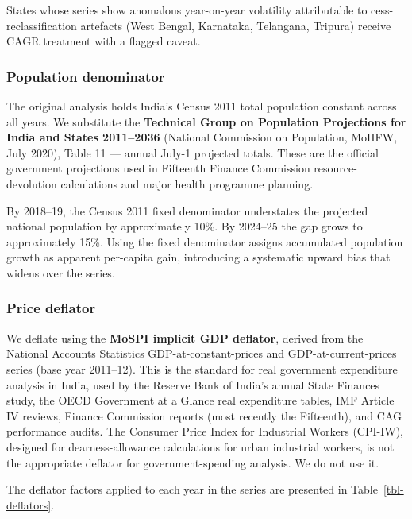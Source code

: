 \documentclass[
  11pt,
  oneside,
  10pt,
  a4paper,
  twocolumn]{article}
\begin{document}
States whose series show anomalous year-on-year volatility attributable
to cess-reclassification artefacts (West Bengal, Karnataka, Telangana,
Tripura) receive CAGR treatment with a flagged caveat.

\subsubsection{Population denominator}\label{population-denominator}

The original analysis holds India's Census 2011 total population
constant across all years. We substitute the \textbf{Technical Group on
Population Projections for India and States 2011--2036} (National
Commission on Population, MoHFW, July 2020), Table 11 --- annual July-1
projected totals. These are the official government projections used in
Fifteenth Finance Commission resource-devolution calculations and major
health programme planning.

By 2018--19, the Census 2011 fixed denominator understates the projected
national population by approximately 10\%. By 2024--25 the gap grows to
approximately 15\%. Using the fixed denominator assigns accumulated
population growth as apparent per-capita gain, introducing a systematic
upward bias that widens over the series.

\subsubsection{Price deflator}\label{price-deflator}

We deflate using the \textbf{MoSPI implicit GDP deflator}, derived from
the National Accounts Statistics GDP-at-constant-prices and
GDP-at-current-prices series (base year 2011--12). This is the standard
for real government expenditure analysis in India, used by the Reserve
Bank of India's annual State Finances study, the OECD Government at a
Glance real expenditure tables, IMF Article IV reviews, Finance
Commission reports (most recently the Fifteenth), and CAG performance
audits. The Consumer Price Index for Industrial Workers (CPI-IW),
designed for dearness-allowance calculations for urban industrial
workers, is not the appropriate deflator for government-spending
analysis. We do not use it.

The deflator factors applied to each year in the series are presented in
Table~\ref{tbl-deflators}.
\end{document}
